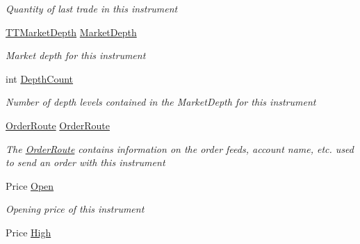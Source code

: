 \begin{DoxyCompactItemize}
\begin{DoxyCompactList}\small\item\em Quantity of last trade in this instrument \end{DoxyCompactList}\item 
\hyperlink{class_e_z_a_p_i_1_1_containers_1_1_t_t_market_depth}{T\-T\-Market\-Depth} \hyperlink{class_e_z_a_p_i_1_1_containers_1_1_t_t_instrument_a9cd33fd90676e4862f67859831725459}{Market\-Depth}
\begin{DoxyCompactList}\small\item\em Market depth for this instrument \end{DoxyCompactList}\item 
int \hyperlink{class_e_z_a_p_i_1_1_containers_1_1_t_t_instrument_a50cdd8a27c71bb4fdaefe7741c3c0279}{Depth\-Count}
\begin{DoxyCompactList}\small\item\em Number of depth levels contained in the Market\-Depth for this instrument \end{DoxyCompactList}\item 
\hyperlink{class_e_z_a_p_i_1_1_containers_1_1_order_route}{Order\-Route} \hyperlink{class_e_z_a_p_i_1_1_containers_1_1_t_t_instrument_a1df90885829b0b46f20b5511b53596d8}{Order\-Route}
\begin{DoxyCompactList}\small\item\em The \hyperlink{class_e_z_a_p_i_1_1_containers_1_1_order_route}{Order\-Route} contains information on the order feeds, account name, etc. used to send an order with this instrument \end{DoxyCompactList}\item 
Price \hyperlink{class_e_z_a_p_i_1_1_containers_1_1_t_t_instrument_ad7db4bf541289c795ed505fdc42b9f94}{Open}
\begin{DoxyCompactList}\small\item\em Opening price of this instrument \end{DoxyCompactList}\item 
Price \hyperlink{class_e_z_a_p_i_1_1_containers_1_1_t_t_instrument_aec69a584ec4a677757a51f664ccf5a7f}{High}

\end{DoxyCompactItemize}

